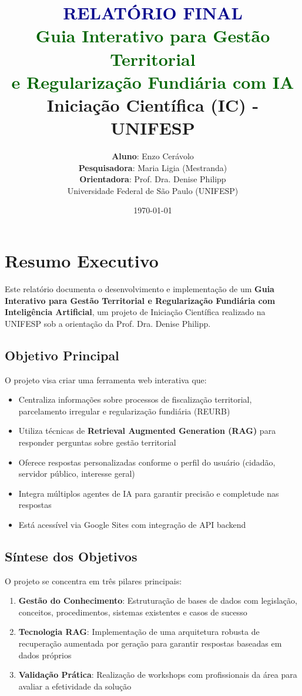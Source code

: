 \documentclass[12pt,a4paper]{report}
\title{
  \textcolor{darkblue}{\textbf{RELATÓRIO FINAL}} \\
  \vspace{0.5cm}
  \textcolor{darkgreen}{\Large Guia Interativo para Gestão Territorial} \\
  \textcolor{darkgreen}{\Large e Regularização Fundiária com IA} \\
  \vspace{0.3cm}
  \textcolor{darktext}{\normalsize Iniciação Científica (IC) - UNIFESP}
}
\author{
  \textbf{Aluno}: Enzo Cerávolo \\
  \textbf{Pesquisadora}: Maria Ligia (Mestranda) \\
  \textbf{Orientadora}: Prof. Dra. Denise Philipp \\
  \vspace{0.5cm}
  Universidade Federal de São Paulo (UNIFESP)
}
\date{\today}
\begin{document}
\maketitle

\tableofcontents
\newpage

\chapter{Resumo Executivo}

Este relatório documenta o desenvolvimento e implementação de um \textbf{Guia Interativo para Gestão Territorial e Regularização Fundiária com Inteligência Artificial}, um projeto de Iniciação Científica realizado na UNIFESP sob a orientação da Prof. Dra. Denise Philipp.

\section{Objetivo Principal}

O projeto visa criar uma ferramenta web interativa que:

\begin{itemize}
  \item Centraliza informações sobre processos de fiscalização territorial, parcelamento irregular e regularização fundiária (REURB)
  \item Utiliza técnicas de \textbf{Retrieval Augmented Generation (RAG)} para responder perguntas sobre gestão territorial
  \item Oferece respostas personalizadas conforme o perfil do usuário (cidadão, servidor público, interesse geral)
  \item Integra múltiplos agentes de IA para garantir precisão e completude nas respostas
  \item Está acessível via Google Sites com integração de API backend
\end{itemize}

\section{Síntese dos Objetivos}

O projeto se concentra em três pilares principais:

\begin{enumerate}
  \item \textbf{Gestão do Conhecimento}: Estruturação de bases de dados com legislação, conceitos, procedimentos, sistemas existentes e casos de sucesso
  \item \textbf{Tecnologia RAG}: Implementação de uma arquitetura robusta de recuperação aumentada por geração para garantir respostas baseadas em dados próprios
  \item \textbf{Validação Prática}: Realização de workshops com profissionais da área para avaliar a efetividade da solução
\end{enumerate}
\end{document}
